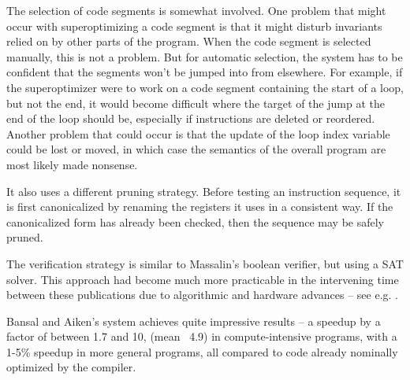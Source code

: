 \documentclass[12pt,twoside]{reedthesis}
\begin{document}
            The selection of code segments is somewhat involved.
            One problem that might occur with superoptimizing a code segment is that it might disturb invariants relied on by other parts of the program.
            When the code segment is selected manually, this is not a problem.
            But for automatic selection, the system has to be confident that the segments won't be jumped into from elsewhere.
            For example, if the superoptimizer were to work on a code segment containing the start of a loop, but not the end, it would become difficult where the target of the jump at the end of the loop should be, especially if instructions are deleted or reordered.
            Another problem that could occur is that the update of the loop index variable could be lost or moved, in which case the semantics of the overall program are most likely made nonsense.
            
            It also uses a different pruning strategy.
            Before testing an instruction sequence, it is first canonicalized by renaming the registers it uses in a consistent way.
            If the canonicalized form has already been checked, then the sequence may be safely pruned.
            
            The verification strategy is similar to Massalin's boolean verifier, but using a SAT solver.
            This approach had become much more practicable in the intervening time between these publications due to algorithmic and hardware advances -- see e.g. \cite{silva1996grasp}.
            
            Bansal and Aiken's system achieves quite impressive results -- a speedup by a factor of between 1.7 and 10, (mean ~4.9) in compute-intensive programs, with a 1-5\% speedup in more general programs, all compared to code already nominally optimized by the compiler.
\end{document}
